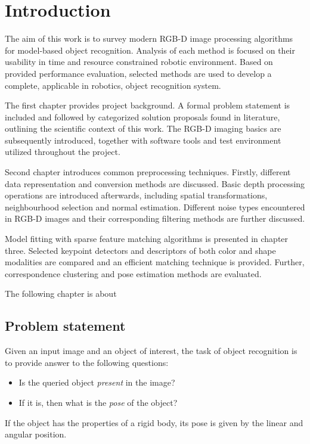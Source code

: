 \chapter{Introduction}
\label{cha:introduction}

The aim of this work is to survey modern RGB-D image processing algorithms for model-based object recognition. Analysis of each method is focused on their usability in time and resource constrained robotic environment. Based on provided performance evaluation, selected methods are used to develop a complete, applicable in robotics, object recognition system.

The first chapter provides project background. A formal problem statement is included and followed by categorized solution proposals found in literature, outlining the scientific context of this work. The RGB-D imaging basics are subsequently introduced, together with software tools and test environment utilized throughout the project.

Second chapter introduces common preprocessing techniques. Firstly, different data representation and conversion methods are discussed. Basic depth processing operations are introduced afterwards, including spatial transformations, neighbourhood selection and normal estimation. Different noise types encountered in RGB-D images and their corresponding filtering methods are further discussed.

Model fitting with sparse feature matching algorithms is presented in chapter three. Selected keypoint detectors and descriptors of both color and shape modalities are compared and an efficient matching technique is provided. Further, correspondence clustering and pose estimation methods are evaluated.

The following chapter is about 


\section{Problem statement}
\label{sec:problem}

Given an input image and an object of interest, the task of object recognition is to provide answer to the following questions:
\begin{itemize}
\item Is the queried object \textit{present} in the image?
\item If it is, then what is the \textit{pose} of the object?
\end{itemize}
If the object has the properties of a rigid body, its pose is given by the linear and angular position.


